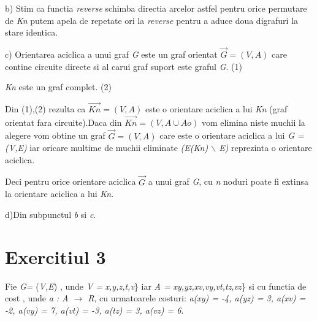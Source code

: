 \documentclass{article}
\begin{document}
b) Stim ca functia \textit{reverse} schimba directia arcelor astfel pentru orice permutare de \textit{Kn} putem apela de repetate ori la \textit{reverse} pentru a aduce doua digrafuri la stare identica. 

c) Orientarea aciclica a unui graf \textit{G} este un graf orientat \textit{$\vec{G}= (V,A)$} care contine circuite directe si al carui graf suport este graful \textit{G}. (1) 

\textit{Kn} este un graf complet. (2)

Din (1),(2) rezulta ca \textit{$\vec{Kn} = (V,A)$} este o orientare aciclica a lui \textit{Kn} (graf orientat fara circuite).Daca din \textit{$\vec{Kn} = (V,A \cup Ao)$} vom elimina niste muchii la alegere vom obtine un graf \textit{$\vec{G} = (V,A)$} care este o orientare aciclica a lui \textit{G = (V,E)} iar oricare multime de muchii eliminate \textit{(E(Kn) $\backslash$ E)} reprezinta o orientare aciclica. 

Deci pentru orice orientare aciclica \textit{$\vec{G}$} a unui graf \textit{G}, cu \textit{n} noduri poate fi extinsa la orientare aciclica a lui \textit{Kn}.

d)Din subpunctul \textit{b} si \textit{c}.
\section*{Exercitiul 3}
     \quad Fie \textit{G=} (\textit{V,E}) , unde \textit{V = }\textlquill
     \textit{x,y,z,t,v}\} iar \textit{A = }\textlquill \textit{xy,yz,xv,vy,vt,tz,vz}\} si cu functia de cost , unde \textit{a : A $\rightarrow$ R}, cu urmatoarele costuri: \textit{a(xy) = -4, a(yz) = 3, a(xv) = -2, a(vy) = 7, a(vt) = -3, a(tz) = 3, a(vz) =  6}.

     
\end{document}
